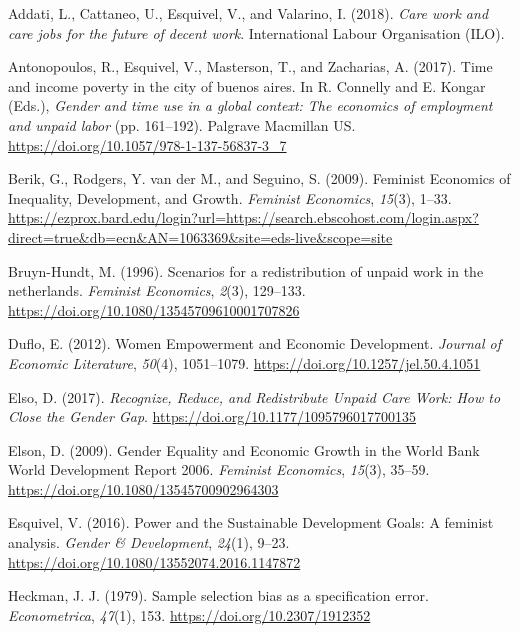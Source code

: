 \documentclass[
  11pt,
]{article}
\newlength{\cslhangindent}
\newenvironment{CSLReferences}[2] %
 {\begin{list}{}{%
  \setlength{\itemindent}{0pt}
  \setlength{\leftmargin}{0pt}
  \setlength{\parsep}{0pt}
  \ifodd #1
   \setlength{\leftmargin}{\cslhangindent}
   \setlength{\itemindent}{-1\cslhangindent}
  \fi
  \setlength{\itemsep}{#2\baselineskip}}}
 {\end{list}}
\begin{document}
\label{refs}
\begin{CSLReferences}{1}{0}
Addati, L., Cattaneo, U., Esquivel, V., and Valarino, I. (2018).
\emph{Care work and care jobs for the future of decent work}.
International Labour Organisation (ILO).

Antonopoulos, R., Esquivel, V., Masterson, T., and Zacharias, A. (2017).
Time and income poverty in the city of buenos aires. In R. Connelly and
E. Kongar (Eds.), \emph{Gender and time use in a global context: The
economics of employment and unpaid labor} (pp. 161--192). Palgrave
Macmillan US. \url{https://doi.org/10.1057/978-1-137-56837-3_7}

Berik, G., Rodgers, Y. van der M., and Seguino, S. (2009). Feminist
{Economics} of {Inequality}, {Development}, and {Growth}. \emph{Feminist
Economics}, \emph{15}(3), 1--33.
\url{https://ezprox.bard.edu/login?url=https://search.ebscohost.com/login.aspx?direct=true&db=ecn&AN=1063369&site=eds-live&scope=site}

Bruyn-Hundt, M. (1996). Scenarios for a redistribution of unpaid work in
the netherlands. \emph{Feminist Economics}, \emph{2}(3), 129--133.
\url{https://doi.org/10.1080/13545709610001707826}

Duflo, E. (2012). Women {Empowerment} and {Economic} {Development}.
\emph{Journal of Economic Literature}, \emph{50}(4), 1051--1079.
\url{https://doi.org/10.1257/jel.50.4.1051}

Elso, D. (2017). \emph{Recognize, {Reduce}, and {Redistribute} {Unpaid}
{Care} {Work}: {How} to {Close} the {Gender} {Gap}}.
\url{https://doi.org/10.1177/1095796017700135}

Elson, D. (2009). Gender {Equality} and {Economic} {Growth} in the
{World} {Bank} {World} {Development} {Report} 2006. \emph{Feminist
Economics}, \emph{15}(3), 35--59.
\url{https://doi.org/10.1080/13545700902964303}

Esquivel, V. (2016). Power and the {Sustainable} {Development} {Goals}:
A feminist analysis. \emph{Gender \& Development}, \emph{24}(1), 9--23.
\url{https://doi.org/10.1080/13552074.2016.1147872}

Heckman, J. J. (1979). Sample selection bias as a specification error.
\emph{Econometrica}, \emph{47}(1), 153.
\url{https://doi.org/10.2307/1912352}


\end{CSLReferences}
\end{document}
